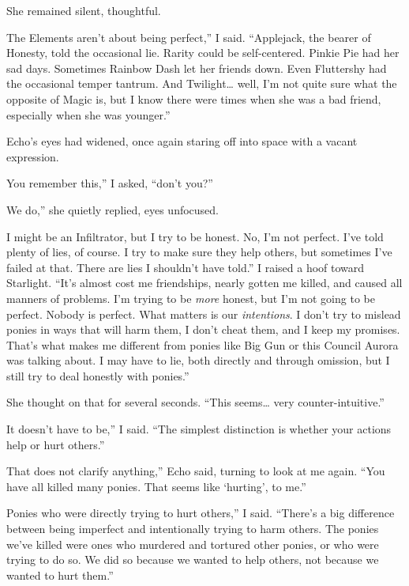 She remained silent, thoughtful.

\leavevmode{}The Elements aren’t about being perfect,” I said. “Applejack, the bearer of Honesty, told the occasional lie. Rarity could be self-centered. Pinkie Pie had her sad days. Sometimes Rainbow Dash let her friends down. Even Fluttershy had the occasional temper tantrum. And Twilight… well, I’m not quite sure what the opposite of Magic is, but I know there were times when she was a bad friend, especially when she was younger.”

Echo’s eyes had widened, once again staring off into space with a vacant expression.

\leavevmode{}You remember this,” I asked, “don’t you?”

\leavevmode{}We do,” she quietly replied, eyes unfocused.

\leavevmode{}I might be an Infiltrator, but I try to be honest. No, I’m not perfect. I’ve told plenty of lies, of course. I try to make sure they help others, but sometimes I’ve failed at that. There are lies I shouldn’t have told.” I raised a hoof toward Starlight. “It’s almost cost me friendships, nearly gotten me killed, and caused all manners of problems. I’m trying to be \textit{more} honest, but I’m not going to be perfect. Nobody is perfect. What matters is our \textit{intentions}. I don’t try to mislead ponies in ways that will harm them, I don’t cheat them, and I keep my promises. That’s what makes me different from ponies like Big Gun or this Council Aurora was talking about. I may have to lie, both directly and through omission, but I still try to deal honestly with ponies.”

She thought on that for several seconds. “This seems… very counter-intuitive.”

\leavevmode{}It doesn’t have to be,” I said. “The simplest distinction is whether your actions help or hurt others.”

\leavevmode{}That does not clarify anything,” Echo said, turning to look at me again. “You have all killed many ponies. That seems like ‘hurting’, to me.”

\leavevmode{}Ponies who were directly trying to hurt others,” I said. “There’s a big difference between being imperfect and intentionally trying to harm others. The ponies we’ve killed were ones who murdered and tortured other ponies, or who were trying to do so. We did so because we wanted to help others, not because we wanted to hurt them.”


